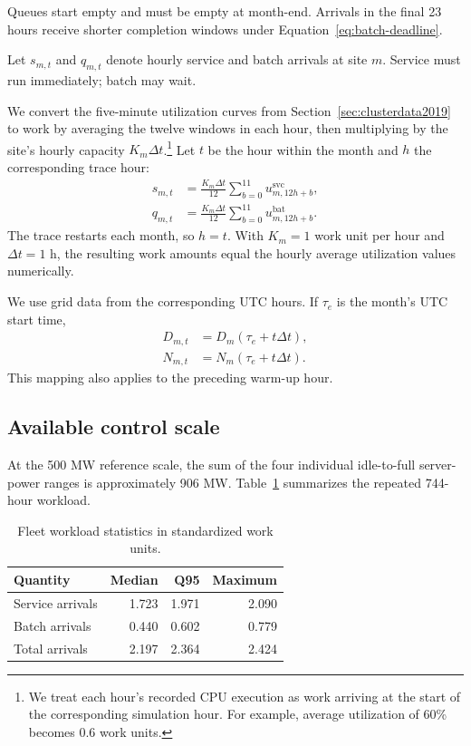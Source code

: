 \documentclass[conference]{IEEEtran}
\begin{document}
Queues start empty and must be empty at month-end. Arrivals in the final
23 hours receive shorter completion windows under
Equation~\eqref{eq:batch-deadline}.

Let \(s_{m,t}\) and \(q_{m,t}\) denote hourly service and batch arrivals at
site \(m\). Service must run immediately; batch may wait.

We convert the five-minute utilization curves from
Section~\ref{sec:clusterdata2019} to work by averaging the twelve windows in
each hour, then multiplying by the site's hourly capacity
\(K_m\Delta t\).\footnote{We treat each hour's recorded CPU execution as
work arriving at the start of the corresponding simulation hour. For
example, average utilization of 60\% becomes 0.6 work units.} Let \(t\)
be the hour within the month and \(h\) the corresponding trace hour:
\begin{align}
  s_{m,t}
  &=
  \frac{K_m\Delta t}{12}
  \sum_{b=0}^{11} u^{\mathrm{svc}}_{m,12h+b},
  \label{eq:synthetic-service-arrivals}\\
  q_{m,t}
  &=
  \frac{K_m\Delta t}{12}
  \sum_{b=0}^{11} u^{\mathrm{bat}}_{m,12h+b}.
  \label{eq:synthetic-batch-arrivals}
\end{align}
The trace restarts each month, so \(h=t\). With \(K_m=1\) work unit per hour
and \(\Delta t=1\) h, the resulting work amounts equal the hourly average
utilization values numerically.

We use grid data from the corresponding UTC hours. If \(\tau_e\) is the
month's UTC start time,
\begin{equation}
  \begin{aligned}
    D_{m,t} &= D_m(\tau_e+t\Delta t), \\
    N_{m,t} &= N_m(\tau_e+t\Delta t).
  \end{aligned}
  \label{eq:episode-grid-map}
\end{equation}
This mapping also applies to the preceding warm-up hour.

\subsection{Available control scale}
\label{subsec:transform-control-authority}

At the 500 MW reference scale, the sum of the four individual idle-to-full
server-power ranges is approximately 906 MW. Table~\ref{tab:workload-feasibility} summarizes the repeated 744-hour
workload. 

\begin{table}[htbp]
  \centering
  \footnotesize
  \caption{Fleet workload statistics in standardized work units.}
  \label{tab:workload-feasibility}
  \begin{tabular}{@{}lrrr@{}}
    \toprule
    Quantity & Median & Q95 & Maximum \\
    \midrule
    Service arrivals & 1.723 & 1.971 & 2.090 \\
    Batch arrivals   & 0.440 & 0.602 & 0.779 \\
    Total arrivals   & 2.197 & 2.364 & 2.424 \\
    \bottomrule
  \end{tabular}
\end{table}
\end{document}
